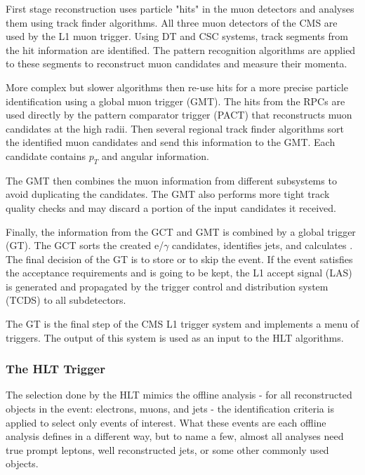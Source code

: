 \begin{normalsize}
First stage reconstruction uses particle "hits" in the muon detectors and analyses them using track finder algorithms. All three muon detectors of the CMS are used by the L1 muon trigger. Using DT and CSC systems, track segments from the hit information are identified. The pattern recognition algorithms are applied to these segments to reconstruct muon candidates and measure their momenta. 

More complex but slower algorithms then re-use hits for a more precise particle identification using a global muon trigger (GMT). 
The hits from the RPCs are used directly by the pattern comparator trigger (PACT) that reconstructs muon candidates at the high radii. Then several regional track finder algorithms sort the identified muon candidates and send this information to the GMT. Each candidate contains $p_T$ and angular information. 

The GMT then combines the muon information from different subsystems to avoid duplicating the candidates. The GMT also performs more tight track quality checks and may discard a portion of the input candidates it received. 

Finally, the information from the GCT and GMT is combined by a global trigger (GT). The GCT sorts the created e/$\gamma$ candidates, identifies jets, and calculates \ETslash. The final decision of the GT is to store or to skip the event. If the event satisfies the acceptance requirements and is going to be kept, the L1 accept signal (LAS) is generated and propagated by the trigger control and distribution system (TCDS) to all subdetectors. 


The GT is the final step of the CMS L1 trigger system and implements a menu of triggers. The output of this system is used as an input to the HLT algorithms. 



\subsubsection{The HLT Trigger}

The selection done by the HLT mimics the offline analysis - for all reconstructed objects in the event: electrons, muons, and jets - the identification criteria is applied to select only events of interest. What these events are each offline analysis defines in a different way, but to name a few, almost all analyses need true prompt leptons, well reconstructed jets, or some other commonly used objects. 



\end{normalsize}
